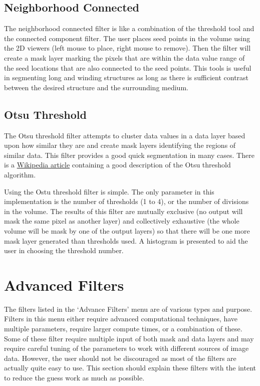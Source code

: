 \documentclass[fleqn,11pt,openany]{book}
\begin{document}
\subsection{Neighborhood Connected}

The neighborhood connected filter is like a combination of the threshold tool and the connected component filter.  The user places seed points in the volume using the 2D viewers (left mouse to place, right mouse to remove).  Then the filter will create a mask layer marking the pixels that are within the data value range of the seed locations that are also connected to the seed points.  This tools is useful in segmenting long and winding structures as long as there is sufficient contrast between the desired structure and the surrounding medium.  

\subsection{Otsu Threshold}

The Otsu threshold filter attempts to cluster data values in a data
layer based upon how similar they are and create mask layers
identifying the regions of similar data.  This filter provides a good
quick segmentation in many cases.  There is a
\href{http://en.wikipedia.org/wiki/Otsu's_method}{Wikipedia article} containing a good description of the Otsu threshold algorithm.

Using the Ostu threshold filter is simple.  The only parameter in this implementation is the number of thresholds (1 to 4), or the number of divisions in the volume.  The results of this filter are mutually exclusive (no output will mask the same pixel as another layer) and collectively exhaustive (the whole volume will be mask by one of the output layers) so that there will be one more mask layer generated than thresholds used.  A histogram is presented to aid the user in choosing the threshold number.

\section{Advanced Filters}

The filters listed in the `Advance Filters' menu are of various types and purpose.  Filters in this menu either require advanced computational techniques, have multiple parameters, require larger compute times, or a combination of these.  Some of these filter require multiple input of both mask and data layers and may require careful tuning of the parameters to work with different sources of image data.  However, the user should not be discouraged as most of the filters are actually quite easy to use.  This section should explain these filters with the intent to reduce the guess work as much as possible. 
\end{document}
